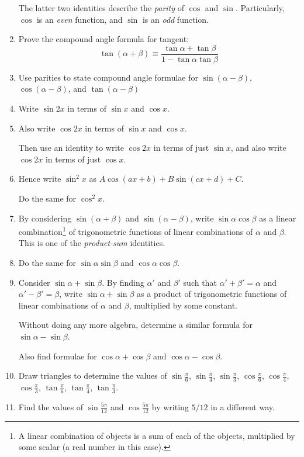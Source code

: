 \begin{enumerate}
  The latter two identities describe the \emph{parity} of \(\cos\) and \(\sin\).
  Particularly, \(\cos\) is an \emph{even} function, and \(\sin\) is an
  \emph{odd} function.
 \item
  Prove the compound angle formula for tangent:
  \begin{equation*}
   \tan(\alpha + \beta) \equiv
   \frac{\tan \alpha + \tan \beta}{1 - \tan \alpha \tan \beta}
  \end{equation*}
 \item
  Use parities to state compound angle formulae for \(\sin(\alpha - \beta)\),
  \(\cos(\alpha - \beta)\), and \(\tan(\alpha - \beta)\)
 \item
  Write \(\sin 2x\) in terms of \(\sin x\) and \(\cos x\).
 \item
  Also write \(\cos 2x\) in terms of \(\sin x\) and \(\cos x\).

  Then use an identity to write \(\cos 2x\) in terms of just \(\sin x\), and
  also write \(\cos 2x\) in terms of just \(\cos x\).
 \item
  Hence write \(\sin^2 x\) as \(A \cos(ax + b) + B \sin(cx + d) + C\).

  Do the same for \(\cos^2 x\).
 \item
  By considering \(\sin(\alpha + \beta)\) and \(\sin(\alpha - \beta)\), write
  \(\sin \alpha \cos \beta\) as a linear combination\footnote{
   A linear combination of objects is a sum of each of the objects, multiplied
   by some scalar (a real number in this case).
  } of trigonometric functions of linear combinations of \(\alpha\) and
  \(\beta\). This is one of the \emph{product-sum} identities.
 \item
  Do the same for \(\sin \alpha \sin \beta\) and
  \(\cos \alpha \cos \beta\).
 \item
  Consider \(\sin \alpha + \sin \beta\). By finding \(\alpha'\) and \(\beta'\)
  such that \(\alpha' + \beta' = \alpha\) and \(\alpha' - \beta' = \beta\),
  write \(\sin \alpha + \sin \beta\) as a product of trigonometric functions of
  linear combinations of \(\alpha\) and \(\beta\), multiplied by some constant.

  Without doing any more algebra, determine a similar formula for
  \(\sin \alpha - \sin \beta\).

  Also find formulae for \(\cos \alpha + \cos \beta\) and
  \(\cos \alpha - \cos \beta\).
 \item
  Draw triangles to determine the values of
  \(\sin \frac \pi 6\), \(\sin \frac \pi 4\), \(\sin \frac \pi 3\),
  \(\cos \frac \pi 6\), \(\cos \frac \pi 4\), \(\cos \frac \pi 3\),
  \(\tan \frac \pi 6\), \(\tan \frac \pi 4\), \(\tan \frac \pi 3\).
 \item
  Find the values of \(\sin \frac{5\pi}{12}\) and \(\cos \frac{5\pi}{12}\) by
  writing \(5/12\) in a different way.


\end{enumerate}
